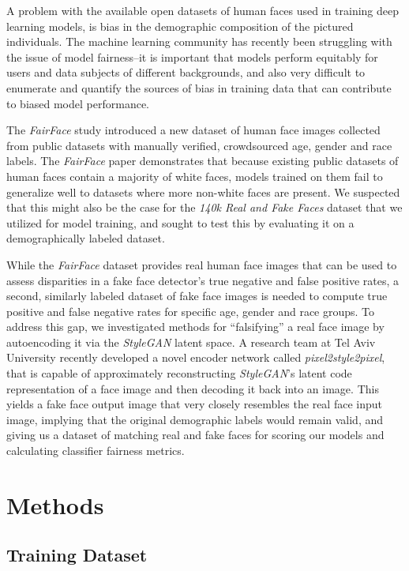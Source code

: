 \documentclass[11pt, letterpaper]{article}
\begin{document}
\begin{multicols}{2}
  A problem with the available open datasets of human faces used in
  training deep learning models, is bias in the demographic
  composition of the pictured individuals. The machine learning
  community has recently been struggling with the issue of model
  fairness--it is important that models perform equitably for users
  and data subjects of different backgrounds, and also very difficult
  to enumerate and quantify the sources of bias in training data that
  can contribute to biased model performance.

  The \emph{FairFace}\cite{karkkainen2019fairface} study introduced a new
  dataset of human face images collected from public datasets with
  manually verified, crowdsourced age, gender and race labels. The
  \emph{FairFace} paper demonstrates that because existing public datasets of
  human faces contain a majority of white faces, models trained on
  them fail to generalize well to datasets where more non-white faces
  are present. We suspected that this might also be the case for the
  \emph{140k Real and Fake Faces} dataset that we utilized for model
  training, and sought to test this by evaluating it on a
  demographically labeled dataset.

  While the \emph{FairFace} dataset provides real human face images
  that can be used to assess disparities in a fake face detector's
  true negative and false positive rates, a second, similarly labeled
  dataset of fake face images is needed to compute true positive and
  false negative rates for specific age, gender and race groups. To
  address this gap, we investigated methods for ``falsifying'' a real
  face image by autoencoding it via the \emph{StyleGAN} latent
  space. A research team at Tel Aviv University recently developed a
  novel encoder network\cite{richardson2020encoding} called
  \emph{pixel2style2pixel}, that is capable of approximately
  reconstructing \emph{StyleGAN}'s latent code representation of a
  face image and then decoding it back into an image. This yields a
  fake face output image that very closely resembles the real face
  input image, implying that the original demographic labels would
  remain valid, and giving us a dataset of matching real and fake
  faces for scoring our models and calculating classifier fairness
  metrics.

  \section{Methods}

  \subsection{Training Dataset}


\end{multicols}
\end{document}
